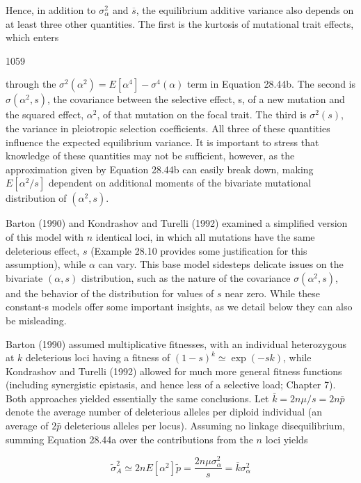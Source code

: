 \documentclass{article}
\begin{document}
Hence, in addition to  $ \sigma_{\alpha}^{2} $ and  $ \overline{s} $, the equilibrium additive variance also depends on at least three other quantities. The first is the kurtosis of mutational trait effects, which enters

1059

through the  $ \sigma^2(\alpha^2) = E[\alpha^4] - \sigma^4(\alpha) $ term in Equation 28.44b. The second is  $ \sigma(\alpha^2, s) $, the covariance between the selective effect, s, of a new mutation and the squared effect,  $ \alpha^2 $, of that mutation on the focal trait. The third is  $ \sigma^2(s) $, the variance in pleiotropic selection coefficients. All three of these quantities influence the expected equilibrium variance. It is important to stress that knowledge of these quantities may not be sufficient, however, as the approximation given by Equation 28.44b can easily break down, making  $ E[\alpha^2/s] $ dependent on additional moments of the bivariate mutational distribution of  $ (\alpha^2, s) $.

Barton (1990) and Kondrashov and Turelli (1992) examined a simplified version of this model with $n$ identical loci, in which all mutations have the same deleterious effect, $s$ (Example 28.10 provides some justification for this assumption), while $\alpha$ can vary. This base model sidesteps delicate issues on the bivariate $(\alpha, s)$ distribution, such as the nature of the covariance $\sigma(\alpha^{2}, s)$, and the behavior of the distribution for values of $s$ near zero. While these constant-s models offer some important insights, as we detail below they can also be misleading.

Barton (1990) assumed multiplicative fitnesses, with an individual heterozygous at $k$ deleterious loci having a fitness of $(1-s)^{k} \simeq \exp(-sk)$, while Kondrashov and Turelli (1992) allowed for much more general fitness functions (including synergistic epistasis, and hence less of a selective load; Chapter 7). Both approaches yielded essentially the same conclusions. Let $\overline{k} = 2n\mu/s = 2n\bar{p}$ denote the average number of deleterious alleles per diploid individual (an average of $2\bar{p}$ deleterious alleles per locus). Assuming no linkage disequilibrium, summing Equation 28.44a over the contributions from the $n$ loci yields

\begin{equation}
\widetilde{\sigma}_{A}^{2}\simeq2n E[\alpha^{2}]\widetilde{p}=\frac{2n\mu\sigma_{\alpha}^{2}}{s}=\overline{k}\sigma_{\alpha}^{2}
\tag{28.45a}
\label{eq:28_45a}
\end{equation}
\end{document}
